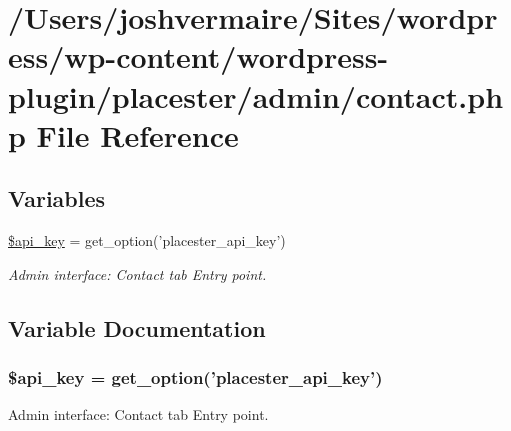 \hypertarget{contact_8php}{
\section{/Users/joshvermaire/Sites/wordpress/wp-\/content/wordpress-\/plugin/placester/admin/contact.php File Reference}
\label{df/d42/contact_8php}
}
\subsection*{Variables}
\begin{DoxyCompactItemize}
\item 
\hyperlink{contact_8php_a186dfe06d14a3bc248c4eb4bcdaec562}{\$api\_\-key} = get\_\-option('placester\_\-api\_\-key')
\begin{DoxyCompactList}\small\item\em Admin interface: Contact tab Entry point. \end{DoxyCompactList}\end{DoxyCompactItemize}


\subsection{Variable Documentation}
\hypertarget{contact_8php_a186dfe06d14a3bc248c4eb4bcdaec562}{
\subsubsection[{\$api\_\-key}]{\setlength{\rightskip}{0pt plus 5cm}\$api\_\-key = get\_\-option('placester\_\-api\_\-key')}}
\label{df/d42/contact_8php_a186dfe06d14a3bc248c4eb4bcdaec562}


Admin interface: Contact tab Entry point. 

